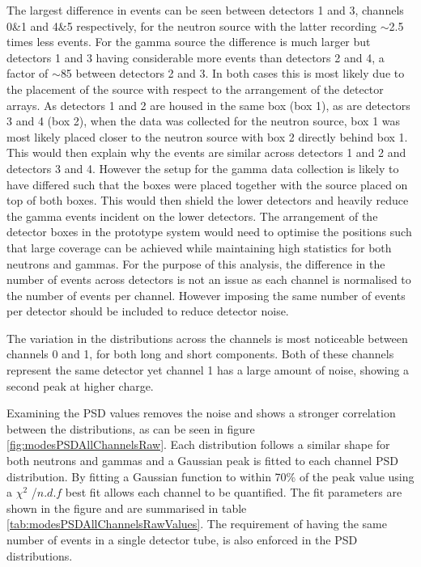 The largest difference in events can be seen between detectors 1 and 3, channels 0\&1 and 4\&5 respectively, for the neutron source with the latter recording $\sim$2.5 times less events. For the gamma source the difference is much larger but detectors 1 and 3 having considerable more events than detectors 2 and 4, a factor of $\sim$85 between detectors 2 and 3. In both cases this is most likely due to the placement of the source with respect to the arrangement of the detector arrays. As detectors 1 and 2 are housed in the same box (box 1), as are detectors 3 and 4 (box 2), when the data was collected for the neutron source, box 1 was most likely placed closer to the neutron source with box 2 directly behind box 1. This would then explain why the events are similar across detectors 1 and 2 and detectors 3 and 4. However the setup for the gamma data collection is likely to have differed such that the boxes were placed together with the source placed on top of both boxes. This would then shield the lower detectors and heavily reduce the gamma events incident on the lower detectors. The arrangement of the detector boxes in the prototype system would need to optimise the positions such that large coverage can be achieved while maintaining high statistics for both neutrons and gammas. For the purpose of this analysis, the difference in the number of events across detectors is not an issue as each channel is normalised to the number of events per channel. However imposing the same number of events per detector should be included to reduce detector noise.

The variation in the distributions across the channels is most noticeable between channels 0 and 1, for both long and short components. Both of these channels represent the same detector yet channel 1 has a large amount of noise, showing a second peak at higher charge. 

Examining the PSD values removes the noise and shows a stronger correlation between the distributions, as can be seen in figure \ref{fig:modesPSDAllChannelsRaw}. Each distribution follows a similar shape for both neutrons and gammas and a Gaussian peak is fitted to each channel PSD distribution. By fitting a Gaussian function to within 70\% of the peak value using a $\chi^{2}$ /$n.d.f$ best fit allows each channel to be quantified. The fit parameters are shown in the figure and are summarised in table \ref{tab:modesPSDAllChannelsRawValues}. The requirement of having the same number of events in a single detector tube, is also enforced in the PSD distributions.
 
